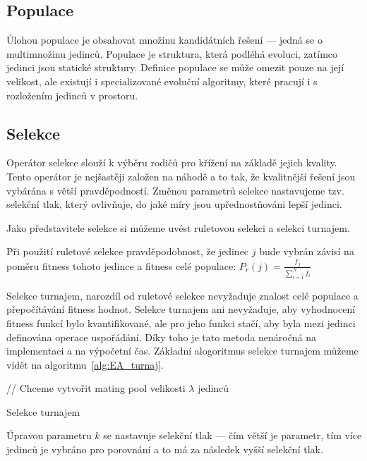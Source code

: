 \subsection{Populace}
Úlohou populace je obsahovat množinu kandidátních řešení --- jedná se o multimnožinu jedinců.
Populace je struktura, která podléhá evoluci, zatímco jedinci jsou statické struktury.
Definice populace se může omezit pouze na její velikost, ale existují i specializované evoluční algoritmy, které pracují i s rozložením jedinců v prostoru.


\subsection{Selekce}
Operátor selekce slouží k výběru rodičů pro křížení na základě jejich kvality.
Tento operátor je nejšastěji založen na náhodě a to tak, že kvalitnější řešení jsou vybárána s větší pravděpodností.
Změnou parametrů selekce nastavujeme tzv. selekční tlak, který ovlivňuje, do jaké míry jsou upřednostňováni lepší jedinci.

Jako představitele selekce si můžeme uvést ruletovou selekci a selekci turnajem.

Při použití ruletové selekce pravděpodobnost, že jedinec $j$ bude vybrán závisí na poměru fitness tohoto jedince a fitness celé populace:
$P_r(j) = \frac{f_j}{\sum_{i=1}^{N}f_i}$

Selekce turnajem, narozdíl od ruletové selekce nevyžaduje znalost celé populace a přepočítávání fitness hodnot.
Selekce turnajem ani nevyžaduje, aby vyhodnocení fitness funkcí bylo kvantifikované, ale pro jeho funkci stačí, aby byla mezi jedinci definována operace uspořádání.
Díky toho je tato metoda nenáročná na implementaci a na výpočetní čas.
Základní alogoritmus selekce turnajem můžeme vidět na algoritmu~\ref{alg:EA_turnaj}.

\begin{algorithm}[H]
    // Chceme vytvořit mating pool velikosti $\lambda$ jedinců\;
    \caption{Selekce turnajem}
    \label{alg:EA_turnaj}
\end{algorithm}

Úpravou parametru $k$ se nastavuje selekční tlak --- čím větší je parametr, tím více jedinců je vybráno pro porovnání a to má za následek vyšší selekční tlak.

